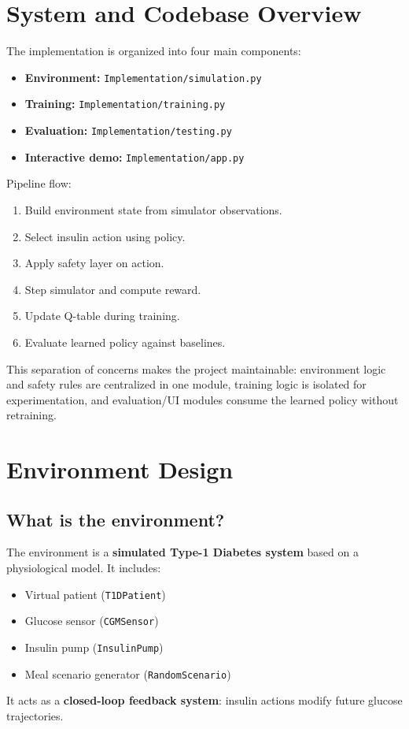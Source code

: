 \documentclass[conference]{IEEEtran}
\begin{document}
\section{System and Codebase Overview}
The implementation is organized into four main components:
\begin{itemize}
    \item \textbf{Environment:} \texttt{Implementation/simulation.py}
    \item \textbf{Training:} \texttt{Implementation/training.py}
    \item \textbf{Evaluation:} \texttt{Implementation/testing.py}
    \item \textbf{Interactive demo:} \texttt{Implementation/app.py}
\end{itemize}

Pipeline flow:
\begin{enumerate}
    \item Build environment state from simulator observations.
    \item Select insulin action using policy.
    \item Apply safety layer on action.
    \item Step simulator and compute reward.
    \item Update Q-table during training.
    \item Evaluate learned policy against baselines.
\end{enumerate}
This separation of concerns makes the project maintainable: environment logic and safety rules are centralized in one module, training logic is isolated for experimentation, and evaluation/UI modules consume the learned policy without retraining.

\section{Environment Design}
\subsection{What is the environment?}
The environment is a \textbf{simulated Type-1 Diabetes system} based on a physiological model. It includes:
\begin{itemize}
    \item Virtual patient (\texttt{T1DPatient})
    \item Glucose sensor (\texttt{CGMSensor})
    \item Insulin pump (\texttt{InsulinPump})
    \item Meal scenario generator (\texttt{RandomScenario})
\end{itemize}
It acts as a \textbf{closed-loop feedback system}: insulin actions modify future glucose trajectories.
\end{document}
